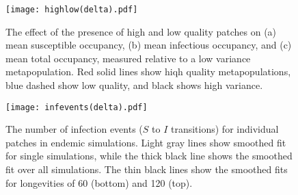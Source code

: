 \documentclass{svjour3}
\begin{document}
\begin{figure}
\centering
\texttt{[image: highlow(delta).pdf]}
\caption{The effect of the presence of high and low quality patches on (a) mean susceptible occupancy, (b) mean infectious occupancy, and (c) mean total occupancy, measured relative to  a low variance metapopulation.  Red solid lines show hiqh quality metapopulations, blue dashed show low quality, and black shows high variance.}
\label{sens_delta}
\end{figure}

\begin{figure}
\centering
\texttt{[image: infevents(delta).pdf]}
\caption{The number of infection events ($S$ to $I$ transitions) for individual patches in endemic simulations.  Light gray lines show smoothed fit for single simulations, while the thick black line shows the smoothed fit over all simulations.  The thin black lines show the smoothed fits for longevities of 60 (bottom) and 120 (top).}
\label{infections_delta}
\end{figure}

\clearpage

     
\end{document}
